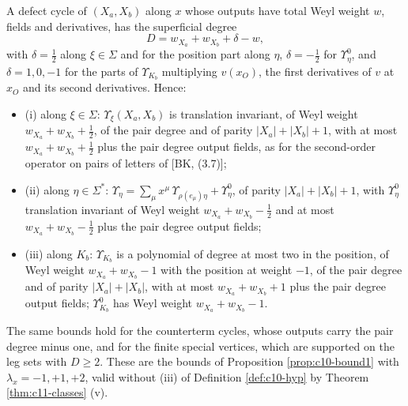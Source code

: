 \begin{proposition}
\label{prop:c11-oddbound}
A defect cycle of $(X_a,X_b)$ along $x$ whose outputs have total Weyl weight $w$, fields and derivatives, has the superficial degree
\[
D=w_{X_a}+w_{X_b}+\delta-w,
\]
with $\delta=\tfrac12$ along $\xi\in\Sigma$ and for the position part along $\eta$, $\delta=-\tfrac12$ for $\Upsilon^0_\eta$, and $\delta=1,0,-1$ for the parts of $\Upsilon_{K_b}$ multiplying $v(x_O)$, the first derivatives of $v$ at $x_O$ and its second derivatives. Hence:
\begin{itemize}
\item (i) along $\xi\in\Sigma$: $\Upsilon_\xi(X_a,X_b)$ is translation invariant, of Weyl weight $w_{X_a}+w_{X_b}+\tfrac12$, of the pair degree and of parity $|X_a|+|X_b|+1$, with at most $w_{X_a}+w_{X_b}+\tfrac12$ plus the pair degree output fields, as for the second-order operator on pairs of letters of [BK, (3.7)];
\item (ii) along $\eta\in\Sigma^*$: $\Upsilon_\eta=\sum_\mu x^\mu\,\Upsilon_{\rho(e_\mu)\eta}+\Upsilon^0_\eta$, of parity $|X_a|+|X_b|+1$, with $\Upsilon^0_\eta$ translation invariant of Weyl weight $w_{X_a}+w_{X_b}-\tfrac12$ and at most $w_{X_a}+w_{X_b}-\tfrac12$ plus the pair degree output fields;
\item (iii) along $K_b$: $\Upsilon_{K_b}$ is a polynomial of degree at most two in the position, of Weyl weight $w_{X_a}+w_{X_b}-1$ with the position at weight $-1$, of the pair degree and of parity $|X_a|+|X_b|$, with at most $w_{X_a}+w_{X_b}+1$ plus the pair degree output fields; $\Upsilon^0_{K_b}$ has Weyl weight $w_{X_a}+w_{X_b}-1$.
\end{itemize}
The same bounds hold for the counterterm cycles, whose outputs carry the pair degree minus one, and for the finite special vertices, which are supported on the leg sets with $D\ge2$. These are the bounds of Proposition \ref{prop:c10-bound1} with $\lambda_x=-1,+1,+2$, valid without (iii) of Definition \ref{def:c10-hyp} by Theorem \ref{thm:c11-classes} (v).
\end{proposition}

